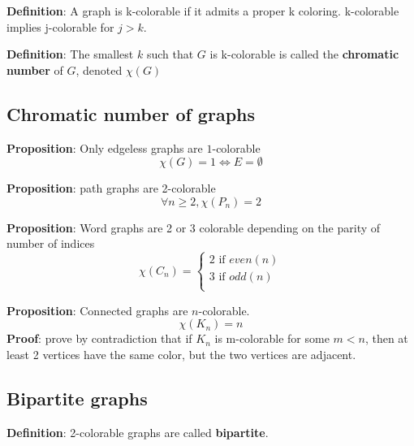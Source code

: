 \begin{framed}
   \textbf{Definition}: A graph is k-colorable if it admits a proper k coloring.  k-colorable implies j-colorable for $j > k$. 
\end{framed}

\begin{framed}
   \textbf{Definition}: The smallest $k$ such that $G$ is k-colorable is called the \textbf{chromatic number} of $G$, denoted $\chi(G)$ 
  
\end{framed}


\subsection{Chromatic number of graphs} 
\begin{framed}
   \textbf{Proposition}: Only edgeless graphs are $1$-colorable
   \[
     \chi(G) = 1 \iff E = \emptyset
   \] 
\end{framed}

\begin{framed}
   \textbf{Proposition}: path graphs are 2-colorable
   \[
     \forall n \geq 2, \chi(P_n) = 2
   \] 
\end{framed}

\begin{framed}
   \textbf{Proposition}: Word graphs are 2 or 3 colorable depending on the parity of number of indices 
   \[
     \chi(C_n) = 
     \begin{cases}
        2 \text{ if } even(n) \\
        3 \text{ if } odd(n) \\
     \end{cases}
   \] 
\end{framed}

\begin{framed}
   \textbf{Proposition}: Connected graphs are $n$-colorable. \\
   \[
     \chi(K_n) = n
   \] 
   \textbf{Proof}: prove by contradiction that if  $K_n$ is m-colorable for some $m < n$, then at least 2 vertices have the same color, but the two vertices are adjacent. 
\end{framed}

\subsection{Bipartite graphs}

\begin{framed}
   \textbf{Definition}: 2-colorable graphs are called \textbf{bipartite}. 
  
\end{framed}

